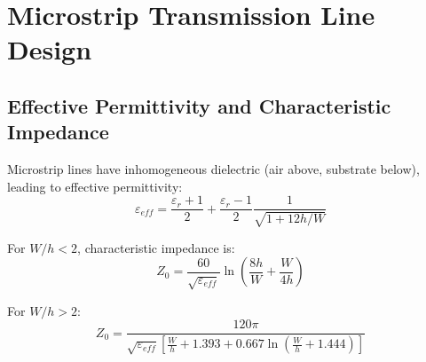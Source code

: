 \documentclass[11pt,a4paper]{article}
\begin{document}
\section{Microstrip Transmission Line Design}

\subsection{Effective Permittivity and Characteristic Impedance}

Microstrip lines have inhomogeneous dielectric (air above, substrate below), leading to effective permittivity:
\begin{equation}
\varepsilon_{eff} = \frac{\varepsilon_r + 1}{2} + \frac{\varepsilon_r - 1}{2}\frac{1}{\sqrt{1 + 12h/W}}
\end{equation}

For $W/h < 2$, characteristic impedance is:
\begin{equation}
Z_0 = \frac{60}{\sqrt{\varepsilon_{eff}}}\ln\left(\frac{8h}{W} + \frac{W}{4h}\right)
\end{equation}

For $W/h > 2$:
\begin{equation}
Z_0 = \frac{120\pi}{\sqrt{\varepsilon_{eff}}\left[\frac{W}{h} + 1.393 + 0.667\ln\left(\frac{W}{h} + 1.444\right)\right]}
\end{equation}
\end{document}
